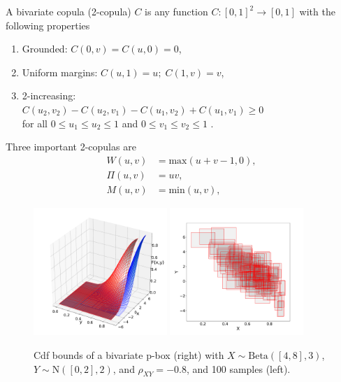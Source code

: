\documentclass{juliacon}
\begin{document}
A bivariate copula (2-copula) $C$ is any function $C:[0,1]^2 \rightarrow [0,  1]$ with the following properties
\begin{enumerate}
  \item Grounded: $C(0,v) = C(u,0) = 0$,
  \item Uniform margins: $C(u,1) = u; \;C(1,v) = v$,
  \item 2-increasing: \\ $C(u_{2},v_{2}) - C_{}(u_{2}, v_{1}) - C(u_{1}, v_{2}) + C(u_{1}, v_{1}) \ge 0$\\ for all $0 \le u_{1} \le u_{2} \le 1$ and $0 \le v_{1} \le v_{2} \le 1$ .
\end{enumerate}
\noindent Three important 2-copulas are
\begin{align*}
  W(u,v) &= \mathrm{max}( u + v-1,0),  \\
  \Pi(u,v) &= uv, \\
  M(u,v) &= \mathrm{min}(u,v),
\end{align*}
\begin{figure}[t!]
  \centering
  \includegraphics[width=0.45\textwidth]{../examples/JuliaCon/fig7/biv_cdf.pdf}\hfill
  \includegraphics[width=0.45\textwidth]{../examples/JuliaCon/fig7/samples.pdf}
  \caption{Cdf bounds of a bivariate p-box (right) with $X \sim \text{Beta}([4,8], 3)$, $Y \sim \text{N}([0,2], 2)$, and $\rho_{XY} = -0.8$, and 100 samples (left).}
  \label{fig:figure7}
\end{figure}
\end{document}
